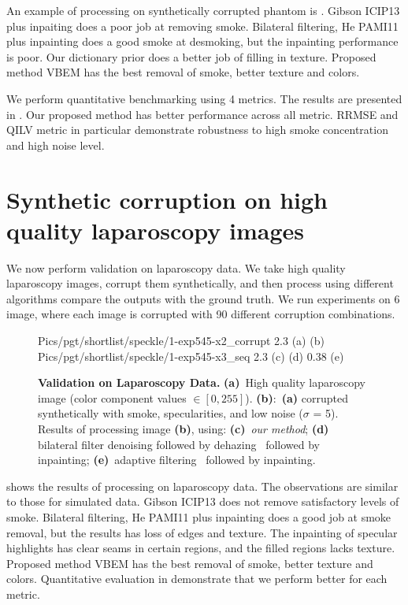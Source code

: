 An example of processing on synthetically corrupted phantom is . Gibson ICIP13 \cite{gibson2013wiener} plus inpaiting does a poor job at removing smoke. Bilateral filtering, He PAMI11 \cite{he2011dark} plus inpainting does a good smoke at desmoking, but the inpainting performance is poor. Our dictionary prior does a better job of filling in texture. Proposed method VBEM has the best removal of smoke, better texture and colors.

We perform quantitative benchmarking using 4 metrics. The results are presented in . Our proposed method has better performance across all metric. RRMSE and QILV metric in particular demonstrate robustness to high smoke concentration and high noise level.

\section{Synthetic corruption on high quality laparoscopy images}
We now perform validation on laparoscopy data. We take high quality laparoscopy images, corrupt them synthetically, and then process using different algorithms compare the outputs with the ground truth. We run experiments on 6 image, where each image is corrupted with 90 different corruption combinations.

\begin{figure}[!h]
     {Pics/pgt/shortlist/speckle/1-exp545-x2_corrupt} {2.3} {(a)} {(b)}
     {Pics/pgt/shortlist/speckle/1-exp545-x3_seq} {2.3} {(c)} {(d)}
     {0.38} {(e)}
    \caption
    {
        {\bf Validation on Laparoscopy Data. }
        {\bf (a)}~High quality laparoscopy image (color component values $\in [0,255]$).
        {\bf (b)}:~{\bf (a)} corrupted synthetically with smoke, specularities, and low noise ($\sigma$ = 5).
        Results of processing image {\bf (b)}, using:
        {\bf (c)}~{\em our method};
        {\bf (d)}~ bilateral filter denoising followed by dehazing~\cite{he2011dark} followed by inpainting;
        {\bf (e)}~adaptive filtering~\cite{gibson2013wiener} followed by inpainting.
    }
    \label{fig:imagesPgt1}
\end{figure}


 shows the results of processing on laparoscopy data. The observations are similar to those for simulated data. Gibson ICIP13 \cite{gibson2013wiener} does not remove satisfactory levels of smoke. Bilateral filtering, He PAMI11 \cite{he2011dark} plus inpainting does a good job at smoke removal, but the results has loss of edges and texture. The inpainting of specular highlights has clear seams in certain regions, and the filled regions lacks texture. Proposed method VBEM has the best removal of smoke, better texture and colors. Quantitative evaluation in  demonstrate that we perform better for each metric.

